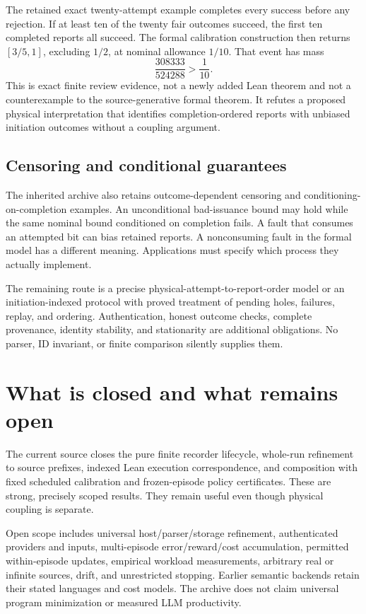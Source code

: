 \documentclass[11pt]{article}
\begin{document}
The retained exact twenty-attempt example completes every success before any
rejection. If at least ten of the twenty fair outcomes succeed, the first ten
completed reports all succeed. The formal calibration construction then
returns $[3/5,1]$, excluding $1/2$, at nominal allowance $1/10$. That event has
mass
\[
 \frac{308333}{524288}>\frac1{10}.
\]
This is exact finite review evidence, not a newly added Lean theorem and not a
counterexample to the source-generative formal theorem. It refutes a proposed
physical interpretation that identifies completion-ordered reports with
unbiased initiation outcomes without a coupling argument.

\subsection{Censoring and conditional guarantees}
The inherited archive also retains outcome-dependent censoring and
conditioning-on-completion examples. An unconditional bad-issuance bound may
hold while the same nominal bound conditioned on completion fails. A fault
that consumes an attempted bit can bias retained reports. A nonconsuming fault
in the formal model has a different meaning. Applications must specify which
process they actually implement.

The remaining route is a precise physical-attempt-to-report-order model or an
initiation-indexed protocol with proved treatment of pending holes, failures,
replay, and ordering. Authentication, honest outcome checks, complete
provenance, identity stability, and stationarity are additional obligations.
No parser, ID invariant, or finite comparison silently supplies them.

\section{What is closed and what remains open}
The current source closes the pure finite recorder lifecycle, whole-run
refinement to source prefixes, indexed Lean execution correspondence, and
composition with fixed scheduled calibration and frozen-episode policy
certificates. These are strong, precisely scoped results. They remain useful
even though physical coupling is separate.

Open scope includes universal host/parser/storage refinement, authenticated
providers and inputs, multi-episode error/reward/cost accumulation, permitted
within-episode updates, empirical workload measurements, arbitrary real or
infinite sources, drift, and unrestricted stopping. Earlier semantic backends
retain their stated languages and cost models. The archive does not claim
universal program minimization or measured LLM productivity.
\end{document}
